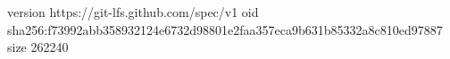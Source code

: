 version https://git-lfs.github.com/spec/v1
oid sha256:f73992abb358932124e6732d98801e2faa357eca9b631b85332a8c810ed97887
size 262240
